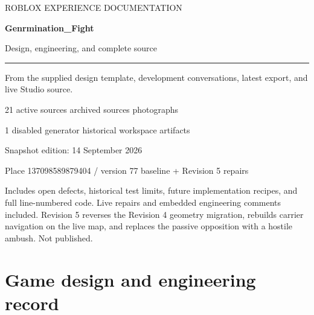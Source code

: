 \documentclass[10pt,a4paper,oneside,openany]{book}
\begin{document}
\frontmatter
\begin{titlepage}
\color{ink}\sffamily
\vspace*{16mm}
{\large ROBLOX EXPERIENCE DOCUMENTATION\par}
\vspace{12mm}
{\fontsize{34}{39}\selectfont\bfseries Genrmination\_Fight\par}
\vspace{7mm}
{\LARGE Design, engineering, and complete source\par}
\vspace{15mm}
\rule{\textwidth}{1pt}
\vspace{7mm}
{\large From the supplied design template, development conversations, latest export, and live Studio source.\par}
\vspace{10mm}
{\large 21 active sources archived sources photographs\par}
{\large 1 disabled generator historical workspace artifacts\par}
\vfill
{\large Snapshot edition: 14 September 2026\par}
{\normalsize Place 137098589879404 / version 77 baseline + Revision 5 repairs\par}
\vspace{5mm}
{\small Includes open defects, historical test limits, future implementation recipes, and full line-numbered code. Live repairs and embedded engineering comments included. Revision 5 reverses the Revision 4 geometry migration, rebuilds carrier navigation on the live map, and replaces the passive opposition with a hostile ambush. Not published.\par}
\end{titlepage}
\tableofcontents
\mainmatter
\part{Game design and engineering record}














\end{document}
